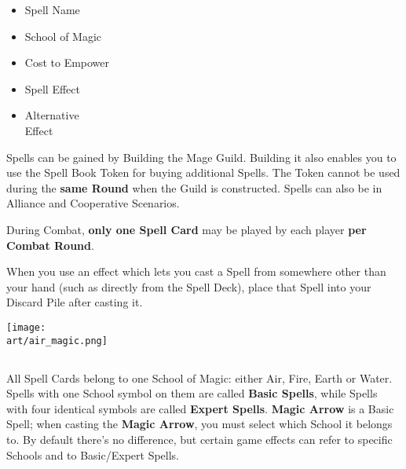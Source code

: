 \begin{multicols*}{2}
{  \noindent
  \begin{minipage}[t]{0.5\linewidth}
    \begin{itemize}[itemsep=0pt, parsep=5pt, topsep=0pt, partopsep=0pt]
      \item[\textbf{1.}] Spell Name
      \item[\textbf{2.}] School of Magic
      \item[\textbf{3.}] Cost to Empower
    \end{itemize}
  \end{minipage}
  \begin{minipage}[t]{0.4\linewidth}
    \begin{itemize}[itemsep=0pt, parsep=5pt, topsep=0pt, partopsep=0pt]
      \item[\textbf{4.}] Spell Effect
      \item[\textbf{5.}] Alternative\\Effect
    \end{itemize}
  \end{minipage}
}
\medskip

Spells can be gained by Building the Mage Guild.
Building it also enables you to use the Spell Book Token for buying additional Spells.
The Token cannot be used during the \textbf{same Round} when the Guild is constructed. Spells can also be  in Alliance and Cooperative Scenarios.

During Combat, \textbf{only one Spell Card} may be played by each player \textbf{per Combat Round}.

\columnbreak
When you use an effect which lets you cast a Spell from somewhere other than your hand (such as directly from the Spell Deck), place that Spell into your Discard Pile after casting it.

\begin{center}
  \vspace*{\fill}
  {\texttt{[image: \\art/air\_magic.png]}}
  \vspace*{\fill}
\end{center}

\subsection*{}
All Spell Cards belong to one School of Magic: either Air, Fire, Earth or Water.
Spells with one School symbol on them are called \textbf{Basic Spells}, while Spells with four identical symbols are called \textbf{Expert Spells}.
\textbf{Magic Arrow} is a Basic Spell; when casting the \textbf{Magic Arrow}, you must select which School it belongs to.
By default there's no difference, but certain game effects can refer to specific Schools and to Basic/Expert Spells.


\end{multicols*}
